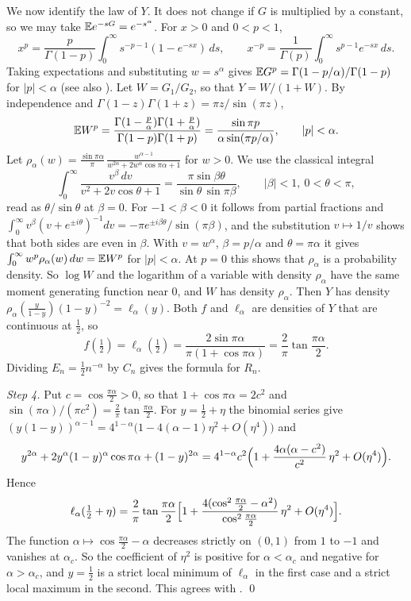 We now identify the law of $Y$. It does not change if $G$ is multiplied by a
constant, so we may take $\mathbb{E} e^{-sG}=e^{-s^\alpha}$. For $x>0$ and $0<p<1$,
\[
x^p=\frac p{\Gamma(1-p)}\int_0^\infty s^{-p-1}(1-e^{-sx})\,ds,\qquad
x^{-p}=\frac1{\Gamma(p)}\int_0^\infty s^{p-1}e^{-sx}\,ds .
\]
Taking expectations and substituting $w=s^\alpha$ gives
$\mathbb{E} G^p=\Gamma(1-p/\alpha)/\Gamma(1-p)$ for $\lvert p\rvert<\alpha$ (see also
\cite{zolotarev1986}). Let $W=G_1/G_2$, so that $Y=W/(1+W)$. By independence
and $\Gamma(1-z)\Gamma(1+z)=\pi z/\sin(\pi z)$,
\[
\mathbb{E} W^p=\frac{\Gamma(1-\frac p\alpha)\Gamma(1+\frac p\alpha)}{\Gamma(1-p)\Gamma(1+p)}
=\frac{\sin\pi p}{\alpha\sin(\pi p/\alpha)},\qquad\lvert p\rvert<\alpha .
\]
Let
$\rho_\alpha(w)=\frac{\sin\pi\alpha}\pi\,\frac{w^{\alpha-1}}{w^{2\alpha}+2w^\alpha\cos\pi\alpha+1}$
for $w>0$. We use the classical integral
\[
\int_0^\infty\frac{v^\beta\,dv}{v^2+2v\cos\theta+1}
=\frac{\pi\sin\beta\theta}{\sin\theta\,\sin\pi\beta},
\qquad\lvert\beta\rvert<1,\ 0<\theta<\pi,
\]
read as $\theta/\sin\theta$ at $\beta=0$. For $-1<\beta<0$ it follows from
partial fractions and
$\int_0^\infty v^\beta(v+e^{\pm i\theta})^{-1}dv=-\pi e^{\pm i\beta\theta}/\sin(\pi\beta)$,
and the substitution $v\mapsto1/v$ shows that both sides are even in
$\beta$. With $v=w^\alpha$, $\beta=p/\alpha$ and $\theta=\pi\alpha$ it gives
$\int_0^\infty w^p\rho_\alpha(w)\,dw=\mathbb{E} W^p$ for $\lvert p\rvert<\alpha$. At
$p=0$ this shows that $\rho_\alpha$ is a probability density. So $\log W$ and
the logarithm of a variable with density $\rho_\alpha$ have the same moment
generating function near $0$, and $W$ has density $\rho_\alpha$. Then $Y$ has
density $\rho_\alpha(\frac y{1-y})(1-y)^{-2}=\ell_\alpha(y)$. Both $f$ and
$\ell_\alpha$ are densities of $Y$ that are continuous at $\frac12$, so
\[
f(\tfrac12)=\ell_\alpha(\tfrac12)=\frac{2\sin\pi\alpha}{\pi(1+\cos\pi\alpha)}
=\frac2\pi\tan\frac{\pi\alpha}2 .
\]
Dividing $E_n=\frac12n^{-\alpha}$ by $C_n$ gives the formula for $R_n$.

\emph{Step 4.} Put $c=\cos\frac{\pi\alpha}2>0$, so that $1+\cos\pi\alpha=2c^2$
and $\sin(\pi\alpha)/(\pi c^2)=\frac2\pi\tan\frac{\pi\alpha}2$. For
$y=\frac12+\eta$ the binomial series give
$(y(1-y))^{\alpha-1}=4^{1-\alpha}\bigl(1-4(\alpha-1)\eta^2+O(\eta^4)\bigr)$ and
\[
y^{2\alpha}+2y^\alpha(1-y)^\alpha\cos\pi\alpha+(1-y)^{2\alpha}
=4^{1-\alpha}c^2\Bigl(1+\frac{4\alpha(\alpha-c^2)}{c^2}\,\eta^2+O(\eta^4)\Bigr).
\]
Hence
\[
\ell_\alpha(\tfrac12+\eta)=\frac2\pi\tan\frac{\pi\alpha}2
\Bigl[1+\frac{4(\cos^2\frac{\pi\alpha}2-\alpha^2)}{\cos^2\frac{\pi\alpha}2}\,\eta^2+O(\eta^4)\Bigr].
\]
The function $\alpha\mapsto\cos\frac{\pi\alpha}2-\alpha$ decreases strictly
on $(0,1)$ from $1$ to $-1$ and vanishes at $\alpha_c$. So the coefficient of
$\eta^2$ is positive for $\alpha<\alpha_c$ and negative for $\alpha>\alpha_c$,
and $y=\frac12$ is a strict local minimum of $\ell_\alpha$ in the first case
and a strict local maximum in the second. This agrees with
\cite[eq.~(7.6)]{godrecheluck2001}.
\qed
